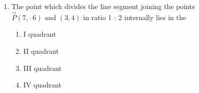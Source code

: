 \begin{enumerate}[label=\thesection.\arabic*,ref=\thesection.\theenumi]

\item The point which divides the line segment joining the points $\vec{P} (7, –6) \text{ and } (3, 4)$ in
ratio 1 : 2 internally lies in the
\begin{enumerate}

\item I quadrant

\item  II quadrant

\item  III quadrant

\item  IV quadrant
\end{enumerate}


\end{enumerate}
